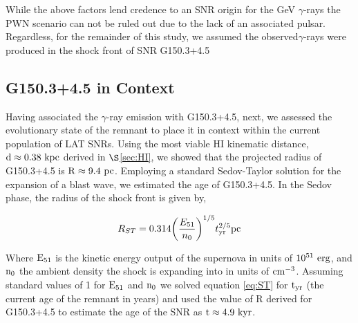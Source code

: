 \documentclass[iop]{emulateapj}
\newcommand{\kibitz}[2]{\ifnum\Comments=1\textcolor{#1}{#2}\fi}
\newcommand{\jamie}[1]{\kibitz{red}      {[JAM: #1]}}
\newcommand{\gam}{$\gamma$-ray}
\newcommand{\Gone}{G150.3+4.5}
\begin{document}
While the above factors lend credence to an SNR origin for the GeV \gam{}s the PWN  scenario can not be ruled out due to the lack of an associated pulsar. Regardless, for the remainder of this study, we assumed the observed\gam{}s were produced in the shock front of SNR \Gone{}

\subsection{\Gone{} in Context }\label{sec:SNRevo}

Having associated the \gam{} emission with \Gone{}, next, we assessed the evolutionary state of the remnant to place it in context within the current population of LAT SNRs. Using the most viable HI kinematic distance, ${\rm d  \approx 0.38~kpc}$ derived in $\S$\ref{sec:HI}, we showed that the projected radius of \Gone{} is ${\rm R \approx 9.4~pc}$. Employing a standard Sedov-Taylor solution for the expansion of a blast wave, we estimated the age of \Gone{}. In the Sedov phase, the radius of the shock front is given by,


\begin{equation} \label{eq:ST}
R_{ST} = 0.314 \bigg{(}\frac{E_{51}}{n_0} \bigg{)}^{1/5} t_{{\rm yr}}^{2/5} {\rm  pc}
\end{equation}

Where ${\rm E_{51}}$ is the kinetic energy output of the  supernova in units of ${\rm 10^{51}~erg}$, and ${\rm n_0}$ the ambient density the shock is expanding into in units of ${\rm cm^{-3}}$. Assuming standard values of 1 for ${\rm E_{51}}$ and ${\rm n_0}$ we solved equation \ref{eq:ST} for ${\rm t_{yr}}$ (the current age of the remnant in years) and used the value of R derived for \Gone{} to estimate the age of the SNR as ${\rm t \approx 4.9~kyr}$.%
\end{document}
